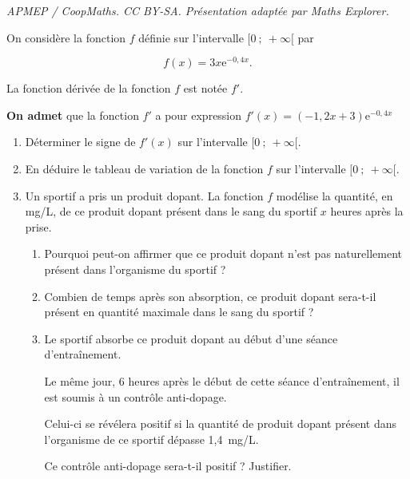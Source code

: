 \documentclass[10pt]{article}
\providecommand{\e}{{\mathrm{e}}}
\providecommand{\np}[2][]{{#2~#1}}
\begin{document}
\noindent\textit{APMEP / CoopMaths. CC BY-SA. Présentation adaptée par Maths Explorer.}\par\medskip
\medskip

On considère la fonction $f$ définie sur l'intervalle $[0~;~+\infty[$ par 

\[f(x)=3x\e^{-0,4x}.\]

La fonction dérivée de la fonction $f$ est notée $f'$.

\textbf{On admet} que la fonction $f'$ a pour expression $f'(x)=(- 1,2x + 3)\e^{-0,4x}$

\medskip

\begin{enumerate}
\item Déterminer le signe de $f'(x)$ sur l'intervalle $[0~;~+\infty[$.
\item En déduire le tableau de variation de la fonction $f$ sur l'intervalle $[0~;~+\infty[$.
\item Un sportif a pris un produit dopant. La fonction $f$ modélise la quantité, en mg/L, de
ce produit dopant présent dans le sang du sportif $x$ heures après la prise.
	\begin{enumerate}
		\item  Pourquoi peut-on affirmer que ce produit dopant n'est pas naturellement présent
dans l'organisme du sportif ?
		\item Combien de temps après son absorption, ce produit dopant sera-t-il présent en
quantité maximale dans le sang du sportif ?
		\item Le sportif absorbe ce produit dopant au début d'une séance d'entraînement.

Le même jour, 6 heures après le début de cette séance d'entraînement, il est soumis à un contrôle anti-dopage.

Celui-ci se révélera positif si la quantité de produit dopant présent dans l'organisme de ce sportif dépasse \np[mg/L]{1,4}.

Ce contrôle anti-dopage sera-t-il positif ? Justifier. 
	\end{enumerate}
\end{enumerate}
\end{document}
